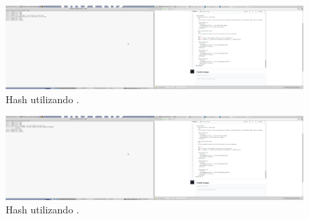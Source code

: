 \documentclass[11pt]{article}
\begin{document}
      \begin{figure}[!h]
        \centering
        \includegraphics[width = .9\textwidth]{gpg2hash_sha1}
        \caption{Hash utilizando .}
      \end{figure}

      \begin{figure}[!h]
        \centering
        \includegraphics[width = .9\textwidth]{gpg2hash_sha256}
        \caption{Hash utilizando .}
      \end{figure}
\end{document}
